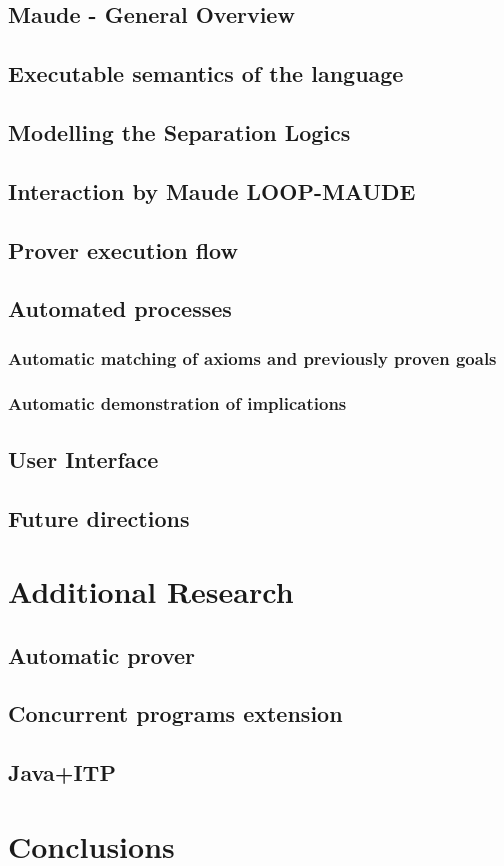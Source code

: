 \documentclass[12pt,a4paper]{article}
\begin{document}
\subsection{Maude - General Overview}
\subsection{Executable semantics of the language}
\subsection{Modelling the Separation Logics}
\subsection{Interaction by Maude LOOP-MAUDE}
\subsection{Prover execution flow}
\subsection{Automated processes}
\subsubsection{Automatic matching of axioms and previously proven goals}
\subsubsection{Automatic demonstration of implications}
\subsection{User Interface}
\subsection{Future directions}
\section{Additional Research}
\subsection{Automatic prover}
\subsection{Concurrent programs extension}
\subsection{Java+ITP}

\section{Conclusions}
\pagebreak


\end{document}
